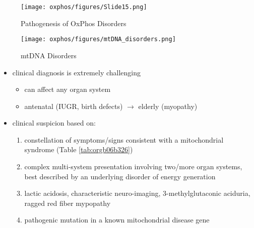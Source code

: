 \documentclass[12pt]{scrartcl}
\begin{document}
\begin{figure}[htbp]
\centering
\texttt{[image: oxphos/figures/Slide15.png]}
\caption[ETC]{\label{fig:orgc58f03b}Pathogenesis of OxPhos Disorders}
\end{figure}


\begin{figure}[htbp]
\centering
\texttt{[image: oxphos/figures/mtDNA\_disorders.png]}
\caption{\label{fig:org54e3503}mtDNA Disorders}
\end{figure}

\begin{itemize}
\item clinical diagnosis is extremely challenging
\begin{itemize}
\item can affect any organ system
\item antenatal (IUGR, birth defects) \(\to\) elderly (myopathy)
\end{itemize}

\item clinical suspicion based on:
\begin{enumerate}
\item constellation of symptoms/signs consistent with a mitochondrial syndrome (Table \ref{tab:orgb06b326})
\item complex multi-system presentation involving two/more organ systems,
best described by an underlying disorder of energy generation
\item lactic acidosis, characteristic neuro-imaging, 3-methylglutaconic
aciduria, ragged red fiber mypopathy
\item pathogenic mutation in a known mitochondrial disease gene
\end{enumerate}
\end{itemize}
\end{document}
